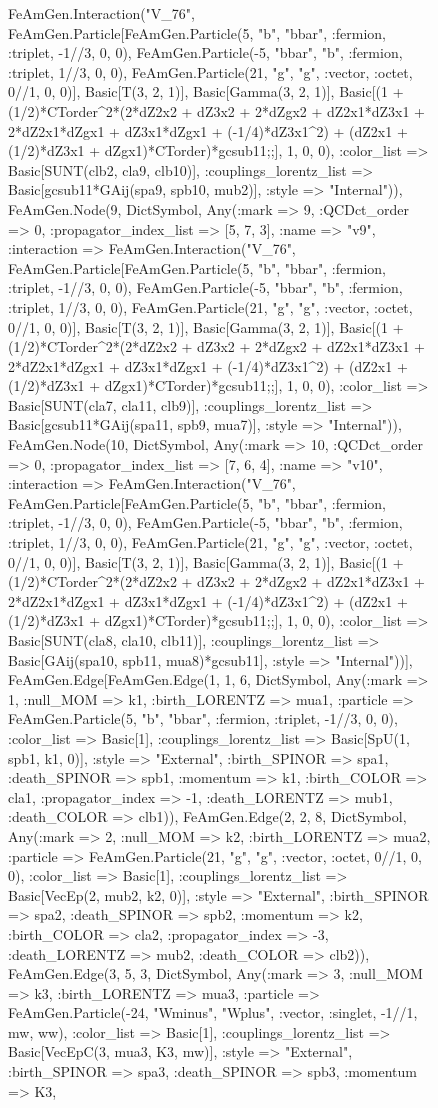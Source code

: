 \documentclass{revtex4}
\begin{document}
\begin{figure}[!htb]
\begin{center}
{FeAmGen.Interaction("V_76", FeAmGen.Particle[FeAmGen.Particle(5, "b", "bbar", :fermion, :triplet, -1//3, 0, 0), FeAmGen.Particle(-5, "bbar", "b", :fermion, :triplet, 1//3, 0, 0), FeAmGen.Particle(21, "g", "g", :vector, :octet, 0//1, 0, 0)], Basic[T(3, 2, 1)], Basic[Gamma(3, 2, 1)], Basic[(1 + (1/2)*CTorder^2*(2*dZ2x2 + dZ3x2 + 2*dZgx2 + dZ2x1*dZ3x1 + 2*dZ2x1*dZgx1 + dZ3x1*dZgx1 + (-1/4)*dZ3x1^2) + (dZ2x1 + (1/2)*dZ3x1 + dZgx1)*CTorder)*gcsub11;;], 1, 0, 0), :color_list => Basic[SUNT(clb2, cla9, clb10)], :couplings_lorentz_list => Basic[gcsub11*GAij(spa9, spb10, mub2)], :style => "Internal")), FeAmGen.Node(9, Dict{Symbol, Any}(:mark => 9, :QCDct_order => 0, :propagator_index_list => [5, 7, 3], :name => "v9", :interaction => FeAmGen.Interaction("V_76", FeAmGen.Particle[FeAmGen.Particle(5, "b", "bbar", :fermion, :triplet, -1//3, 0, 0), FeAmGen.Particle(-5, "bbar", "b", :fermion, :triplet, 1//3, 0, 0), FeAmGen.Particle(21, "g", "g", :vector, :octet, 0//1, 0, 0)], Basic[T(3, 2, 1)], Basic[Gamma(3, 2, 1)], Basic[(1 + (1/2)*CTorder^2*(2*dZ2x2 + dZ3x2 + 2*dZgx2 + dZ2x1*dZ3x1 + 2*dZ2x1*dZgx1 + dZ3x1*dZgx1 + (-1/4)*dZ3x1^2) + (dZ2x1 + (1/2)*dZ3x1 + dZgx1)*CTorder)*gcsub11;;], 1, 0, 0), :color_list => Basic[SUNT(cla7, cla11, clb9)], :couplings_lorentz_list => Basic[gcsub11*GAij(spa11, spb9, mua7)], :style => "Internal")), FeAmGen.Node(10, Dict{Symbol, Any}(:mark => 10, :QCDct_order => 0, :propagator_index_list => [7, 6, 4], :name => "v10", :interaction => FeAmGen.Interaction("V_76", FeAmGen.Particle[FeAmGen.Particle(5, "b", "bbar", :fermion, :triplet, -1//3, 0, 0), FeAmGen.Particle(-5, "bbar", "b", :fermion, :triplet, 1//3, 0, 0), FeAmGen.Particle(21, "g", "g", :vector, :octet, 0//1, 0, 0)], Basic[T(3, 2, 1)], Basic[Gamma(3, 2, 1)], Basic[(1 + (1/2)*CTorder^2*(2*dZ2x2 + dZ3x2 + 2*dZgx2 + dZ2x1*dZ3x1 + 2*dZ2x1*dZgx1 + dZ3x1*dZgx1 + (-1/4)*dZ3x1^2) + (dZ2x1 + (1/2)*dZ3x1 + dZgx1)*CTorder)*gcsub11;;], 1, 0, 0), :color_list => Basic[SUNT(cla8, cla10, clb11)], :couplings_lorentz_list => Basic[GAij(spa10, spb11, mua8)*gcsub11], :style => "Internal"))], FeAmGen.Edge[FeAmGen.Edge(1, 1, 6, Dict{Symbol, Any}(:mark => 1, :null_MOM => k1, :birth_LORENTZ => mua1, :particle => FeAmGen.Particle(5, "b", "bbar", :fermion, :triplet, -1//3, 0, 0), :color_list => Basic[1], :couplings_lorentz_list => Basic[SpU(1, spb1, k1, 0)], :style => "External", :birth_SPINOR => spa1, :death_SPINOR => spb1, :momentum => k1, :birth_COLOR => cla1, :propagator_index => -1, :death_LORENTZ => mub1, :death_COLOR => clb1)), FeAmGen.Edge(2, 2, 8, Dict{Symbol, Any}(:mark => 2, :null_MOM => k2, :birth_LORENTZ => mua2, :particle => FeAmGen.Particle(21, "g", "g", :vector, :octet, 0//1, 0, 0), :color_list => Basic[1], :couplings_lorentz_list => Basic[VecEp(2, mub2, k2, 0)], :style => "External", :birth_SPINOR => spa2, :death_SPINOR => spb2, :momentum => k2, :birth_COLOR => cla2, :propagator_index => -3, :death_LORENTZ => mub2, :death_COLOR => clb2)), FeAmGen.Edge(3, 5, 3, Dict{Symbol, Any}(:mark => 3, :null_MOM => k3, :birth_LORENTZ => mua3, :particle => FeAmGen.Particle(-24, "Wminus", "Wplus", :vector, :singlet, -1//1, mw, ww), :color_list => Basic[1], :couplings_lorentz_list => Basic[VecEpC(3, mua3, K3, mw)], :style => "External", :birth_SPINOR => spa3, :death_SPINOR => spb3, :momentum => K3, }
\end{center}
\end{figure}
\end{document}
